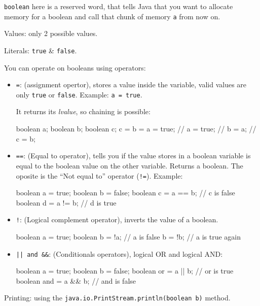 \documentclass[8pt, a4paper, oneside]{extarticle}
\begin{document}
\verb+boolean+ here is a reserved word, that tells Java that you want to
allocate memory for a boolean and call that chunk of memory \verb+a+ from now
on.

Values: only 2 possible values.

Literals: \verb+true+ \& \verb+false+.

You can operate on booleans using operators:

\begin{itemize}

\item \verb+=+: (assignment opertor), stores a value inside the variable, valid
  values are only \verb+true+ or \verb+false+. Example: \verb+a = true+.

  It returns its \emph{lvalue}, so chaining is possible:

\begin{blackboard}
boolean a;
boolean b;
boolean c;
c = b = a = true;
// a = true;
// b = a;
// c = b;
\end{blackboard}

\item \verb+==+: (Equal to operator), tells you if the value stores in a
  boolean variable is equal to the boolean value on the other variable. Returns
  a boolean. The oposite is the ``Not equal to'' operator (\verb+!=+). Example:

\begin{blackboard}
boolean a = true;
boolean b = false;
boolean c = a == b; // c is false
boolean d = a != b; // d is true
\end{blackboard}

\item \verb+!+: (Logical complement operator), inverts the value of a boolean.

\begin{blackboard}
boolean a = true;
boolean b = !a; // a is false
b = !b; // a is true again
\end{blackboard}

\item \verb+|| and &&+: (Conditionals operators), logical OR and logical AND:

\begin{blackboard}
boolean a = true;
boolean b = false;
boolean or = a || b; // or is true
boolean and = a && b; // and is false
\end{blackboard}

\end{itemize}

Printing: using the \verb+java.io.PrintStream.println(boolean b)+ method.
\end{document}
